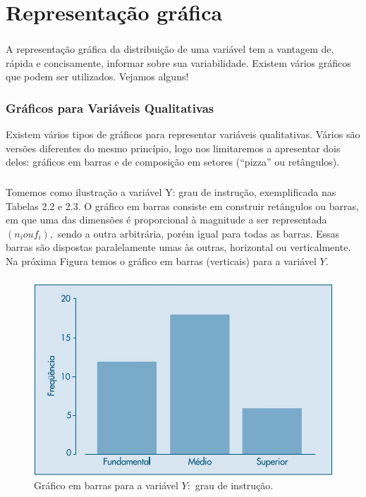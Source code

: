 \documentclass[14pt,aspectratio=1610]{beamer}
\begin{document}
\section{Representação gráfica}
\begin{frame}{}
\frametitle{}
\begin{block}{}
\justifying
A representação gráfica da distribuição de uma variável tem a vantagem de, rápida e concisamente, informar sobre sua variabilidade. Existem vários gráficos que podem ser utilizados. Vejamos alguns!
\end{block}
\end{frame}

\begin{frame}{}
\frametitle{Gráficos para Variáveis Qualitativas}
\begin{block}{}
\justifying
Existem vários tipos de gráficos para representar variáveis qualitativas. Vários são
versões diferentes do mesmo princípio, logo nos limitaremos a apresentar dois deles:
gráficos em barras e de composição em setores (“pizza” ou retângulos).
\end{block}
\end{frame}

\begin{frame}{}
\frametitle{}
\begin{block}{}
\justifying
Tomemos como ilustração a variável Y: grau de instrução, exemplificada
nas Tabelas 2.2 e 2.3. O gráfico em barras consiste em construir retângulos ou barras,
em que uma das dimensões é proporcional à magnitude a ser representada $(n_{i} ou 
f_{i}),$ sendo a outra arbitrária, porém igual para todas as barras. Essas barras são dispostas paralelamente umas às outras, horizontal ou verticalmente. Na próxima Figura temos o gráfico em barras (verticais) para a variável $Y.$
\end{block}
\end{frame}

\begin{frame}{}
\frametitle{}
\begin{block}{}
\justifying
\begin{figure}[H]
    \centering
    \includegraphics[scale=0.5]{Fig3}
    \caption{Gráfico em barras para a variável $Y:$ grau de instrução.}
    \label{Fig3_ex}
  \end{figure}
\end{block}
\end{frame}
\end{document}

